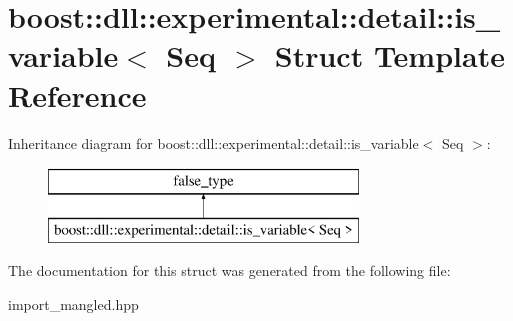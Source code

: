 \hypertarget{a00180}{}\section{boost\+:\+:dll\+:\+:experimental\+:\+:detail\+:\+:is\+\_\+variable$<$ Seq $>$ Struct Template Reference}
\label{a00180}
Inheritance diagram for boost\+:\+:dll\+:\+:experimental\+:\+:detail\+:\+:is\+\_\+variable$<$ Seq $>$\+:\begin{figure}[H]
\begin{center}
\leavevmode
\includegraphics[height=2.000000cm]{a00180}
\end{center}
\end{figure}


The documentation for this struct was generated from the following file\+:\begin{DoxyCompactItemize}
\item 
import\+\_\+mangled.\+hpp\end{DoxyCompactItemize}

